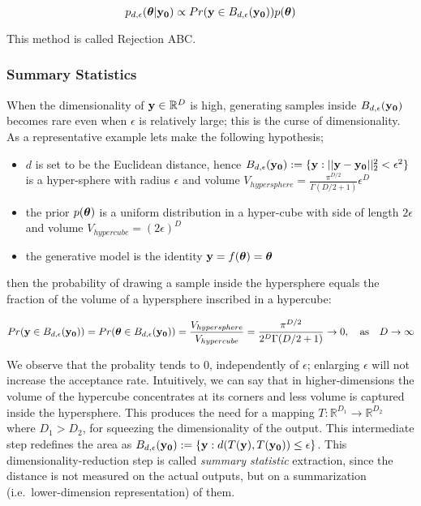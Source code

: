 \begin{equation} \label{eq:approx_posterior}
  p_{d,\epsilon}(\boldsymbol{\theta}|\mathbf{y_0}) \propto Pr(\mathbf{y} \in
  B_{d,\epsilon}(\mathbf{y_0})) p(\boldsymbol{\theta})
\end{equation}

\noindent
This method is called Rejection ABC.

\subsubsection{Summary Statistics}

When the dimensionality of $\mathbf{y} \in \mathbb{R}^D$ is high, generating
samples inside $B_{d,\epsilon} (\mathbf{y_0})$ becomes rare even when $\epsilon$ is
relatively large; this is the curse of dimensionality. As a
representative example lets make the following hypothesis;

\begin{itemize}
\item $d$ is set to be the Euclidean distance, hence
  $B_{d,\epsilon}(\mathbf{y_0}) := \{ \mathbf{y}: ||\mathbf{y} - \mathbf{y_0}||_2^2 < \epsilon^2 \}$ is a
  hyper-sphere with radius $\epsilon$ and volume $V_{hypersphere} = \frac{\pi^{D/2}}{\Gamma(D/2 + 1)} \epsilon^D$
\item the prior $p(\boldsymbol{\theta})$ is a uniform distribution in a hyper-cube with side of
  length $2\epsilon$ and volume $V_{hypercube} = (2\epsilon)^D$
\item the generative model is the identity $\mathbf{y}=f(\boldsymbol{\theta})= \boldsymbol{\theta} $
\end{itemize}

\noindent
then the probability of drawing a sample inside the hypersphere equals
the fraction of the volume of a hypersphere inscribed in a hypercube:

\begin{equation}
  Pr(\mathbf{y} \in B_{d,\epsilon} (\mathbf{y_0}))
  = Pr(\boldsymbol{\theta} \in B_{d,\epsilon} (\mathbf{y_0}))
  = \frac{V_{hypersphere}}{V_{hypercube}}
  = \frac{\pi^{D/2}}{2^D\Gamma(D/2 + 1)} \rightarrow 0, \quad \text{as} \quad D \rightarrow \infty
\end{equation}

\noindent
We observe that the probality tends to $0$, independently of
$\epsilon$; enlarging $\epsilon$ will not increase the acceptance
rate. Intuitively, we can say that in higher-dimensions the volume of
the hypercube concentrates at its corners and less volume is captured
inside the hypersphere. This produces the need for a mapping
$T: \mathbb{R}^{D_1} \rightarrow \mathbb{R}^{D_2}$ where $D_1 > D_2$,
for squeezing the dimensionality of the output. This intermediate step
redefines the area as
$B_{d,\epsilon}(\mathbf{y_0}) := \{\mathbf{y}: d(T(\mathbf{y}), T(\mathbf{y_0})) \leq \epsilon \}$. This
dimensionality-reduction step is called \textit{summary statistic}
extraction, since the distance is not measured on the actual outputs,
but on a summarization (i.e.\ lower-dimension representation) of them.

